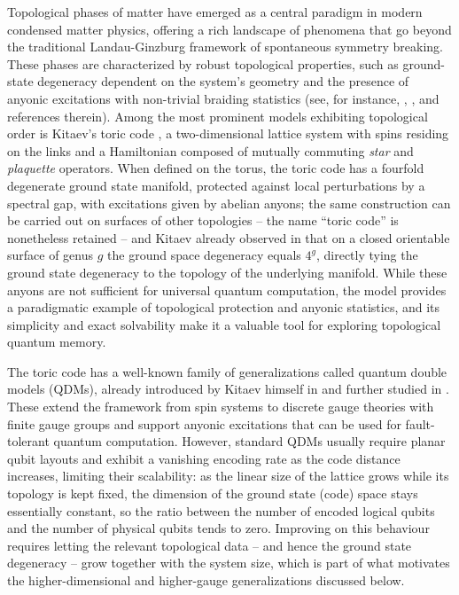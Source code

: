 \documentclass[a4paper,12pt,twoside,reqno]{amsart}
\theoremstyle{plain}
\theoremstyle{definition}
\theoremstyle{remark}
\numberwithin{equation}{section}
\numberwithin{figure}{section}
\numberwithin{table}{section}
\newcommand{\cites}[1]{\cite{#1}}
\begin{document}
	
	Topological phases of matter have emerged as a central paradigm in modern condensed matter physics, offering a rich landscape of phenomena that go beyond the traditional Landau-Ginzburg framework of spontaneous symmetry breaking. These phases are characterized by robust topological properties, such as ground-state degeneracy dependent on the system's geometry and the presence of anyonic excitations with non-trivial braiding statistics (see, for instance, \cite{2008PhRvL.101a0504L}, \cite{2010PhRvL.104m0502F}, and references therein). Among the most prominent models exhibiting topological order is Kitaev's toric code \cite{Kitaev_2003}, a two-dimensional lattice system with spins residing on the links and a Hamiltonian composed of mutually commuting \textit{star} and \textit{plaquette} operators. When defined on the torus, the toric code has a fourfold degenerate ground state manifold, protected against local perturbations by a spectral gap, with excitations given by abelian anyons; the same construction can be carried out on surfaces of other topologies -- the name ``toric code'' is nonetheless retained -- and Kitaev already observed in \cite{Kitaev_2003} that on a closed orientable surface of genus $g$ the ground space degeneracy equals $4^g$, directly tying the ground state degeneracy to the topology of the underlying manifold. While these anyons are not sufficient for universal quantum computation, the model provides a paradigmatic example of topological protection and anyonic statistics, and its simplicity and exact solvability make it a valuable tool for exploring topological quantum memory.
	
	\medskip
	
	The toric code has a well-known family of generalizations called quantum double models (QDMs), already introduced by Kitaev himself in \cite{Kitaev_2003} and further studied in \cites{Naaijkens-2011,Cui_2020,Bols_2025}. These extend the framework from spin systems to discrete gauge theories with finite gauge groups and support anyonic excitations that can be used for fault-tolerant quantum computation. However, standard QDMs usually require planar qubit layouts and exhibit a vanishing encoding rate as the code distance increases, limiting their scalability: as the linear size of the lattice grows while its topology is kept fixed, the dimension of the ground state (code) space stays essentially constant, so the ratio between the number of encoded logical qubits and the number of physical qubits tends to zero. Improving on this behaviour requires letting the relevant topological data -- and hence the ground state degeneracy -- grow together with the system size, which is part of what motivates the higher-dimensional and higher-gauge generalizations discussed below.
	
\end{document}
